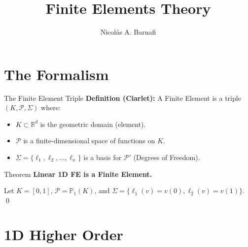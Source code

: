 \documentclass[aspectratio=169]{beamer}
\title[Finite Elements I]{Finite Elements Theory}
\author{Nicol\'as A. Barnafi}
\date{}
\begin{document}
\begin{frame}
    \titlepage
\end{frame}

\section{The Formalism}

\begin{frame}{The Finite Element Triple}
    \textbf{Definition (Ciarlet):} A Finite Element is a triple $(K, \mathcal{P}, \Sigma)$ where:
    \begin{itemize}
        \item $K \subset \mathbb{R}^d$ is the geometric domain (element).
        \item $\mathcal{P}$ is a finite-dimensional space of functions on $K$.
        \item $\Sigma = \{ \ell_1, \ell_2, \dots, \ell_n \}$ is a basis for $\mathcal{P}'$ (Degrees of Freedom).
    \end{itemize}

    \vspace{0.2cm}
    \begin{block}{Theorem}
        \textbf{Linear 1D FE is a Finite Element.}

        Let $K = [0, 1]$, $\mathcal{P} = \mathbb{P}_1(K)$, and $\Sigma = \{ \ell_1(v)=v(0), \ell_2(v)=v(1) \}$. \qed
    \end{block}
\end{frame}

\section{1D Higher Order}
\end{document}
